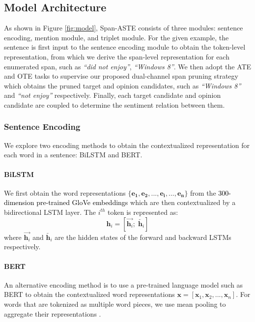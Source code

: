 \documentclass[11pt,a4paper]{article}
\newcommand{\cmt}[1]{\ignorespaces}
\begin{document}
\subsection{Model Architecture}
As shown in Figure \ref{fig:model}, 
Span-ASTE consists of three modules: sentence encoding, mention module, and triplet module. 
For the given example, the sentence is first input to the sentence encoding module to obtain the token-level representation, from which we derive the span-level representation for each enumerated span, such as \textit{``did not enjoy''}, \textit{``Windows 8''}. 
We then adopt the ATE and OTE tasks to supervise our proposed dual-channel span pruning strategy which obtains the pruned target and opinion candidates, such as \textit{``Windows 8''} and \textit{``not enjoy''} respectively.
Finally, each target candidate and opinion candidate are coupled to determine the sentiment relation between them.





\subsubsection{Sentence Encoding}
We explore two encoding methods to obtain the contextualized representation for each word in a sentence: BiLSTM and BERT.
\paragraph{BiLSTM}
We 
first obtain the word representations $\{\mathbf{e_1}, \mathbf{e_2}, ...,\mathbf{e_i}, ..., \mathbf{e_n}\}$ from the 
\textcolor{black}{300-dimension pre-trained GloVe \cite{pennington2014glove} \cmt{word} embeddings}
which are then contextualized by a bidirectional LSTM \cite{lstm97} layer.
The $i^{th}$ token is represented as:
\begin{equation}
    \mathbf{h}_i=[\overrightarrow{\mathbf{h}_i}; \; \overleftarrow{\mathbf{h}_i}]
\end{equation}
where $\overrightarrow{\mathbf{h}_i}$ and $\overleftarrow{\mathbf{h}_i}$ are the hidden states of the forward and backward LSTMs respectively. 

\paragraph{BERT} 
An alternative encoding method 
is to use a pre-trained language model such as BERT \cite{devlin2019bert} to obtain the contextualized word representations
$\mathbf{x}= [ \mathbf{x}_1, \mathbf{x}_2, ..., \mathbf{x}_n]$.
For words that are tokenized as multiple word pieces, we use mean pooling to aggregate their representations \cmt{across word pieces}.
\end{document}

